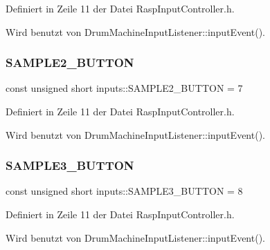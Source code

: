 Definiert in Zeile 11 der Datei Rasp\+Input\+Controller.\+h.



Wird benutzt von Drum\+Machine\+Input\+Listener\+::input\+Event().

\mbox{\label{namespaceinputs_afcf2086c7f58f801e5654d8e573d928c}} 
\subsubsection{\texorpdfstring{S\+A\+M\+P\+L\+E2\+\_\+\+B\+U\+T\+T\+ON}{SAMPLE2\_BUTTON}}
{\footnotesize\ttfamily const unsigned short inputs\+::\+S\+A\+M\+P\+L\+E2\+\_\+\+B\+U\+T\+T\+ON = 7}



Definiert in Zeile 11 der Datei Rasp\+Input\+Controller.\+h.



Wird benutzt von Drum\+Machine\+Input\+Listener\+::input\+Event().

\mbox{\label{namespaceinputs_a17158d35ca30fb91c6f9f757ce0d7ccc}} 
\subsubsection{\texorpdfstring{S\+A\+M\+P\+L\+E3\+\_\+\+B\+U\+T\+T\+ON}{SAMPLE3\_BUTTON}}
{\footnotesize\ttfamily const unsigned short inputs\+::\+S\+A\+M\+P\+L\+E3\+\_\+\+B\+U\+T\+T\+ON = 8}



Definiert in Zeile 11 der Datei Rasp\+Input\+Controller.\+h.



Wird benutzt von Drum\+Machine\+Input\+Listener\+::input\+Event().

\mbox{\label{namespaceinputs_ac9ccac580f0955e454a367ddc6421d78}} 
